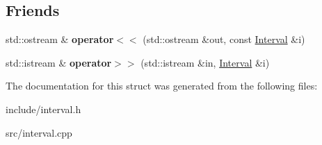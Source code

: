 \subsection*{Friends}
\begin{DoxyCompactItemize}
\item 
\mbox{\label{structInterval_aefc4f69a148902362ea69c142c80bf06}} 
std\+::ostream \& {\bfseries operator$<$$<$} (std\+::ostream \&out, const \hyperlink{structInterval}{Interval} \&i)
\item 
\mbox{\label{structInterval_aa12d67881f36e88cfdfcd39aec59b132}} 
std\+::istream \& {\bfseries operator$>$$>$} (std\+::istream \&in, \hyperlink{structInterval}{Interval} \&i)
\end{DoxyCompactItemize}


The documentation for this struct was generated from the following files\+:\begin{DoxyCompactItemize}
\item 
include/interval.\+h\item 
src/interval.\+cpp\end{DoxyCompactItemize}

